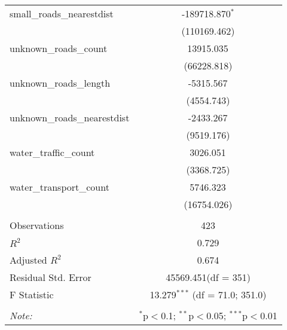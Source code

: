 \begin{table}[!htbp]
\begin{tabular}{@{\extracolsep{5pt}}lc}
 small_roads_nearestdist & -189718.870$^{*}$ \\
  & (110169.462) \\
 unknown_roads_count & 13915.035$^{}$ \\
  & (66228.818) \\
 unknown_roads_length & -5315.567$^{}$ \\
  & (4554.743) \\
 unknown_roads_nearestdist & -2433.267$^{}$ \\
  & (9519.176) \\
 water_traffic_count & 3026.051$^{}$ \\
  & (3368.725) \\
 water_transport_count & 5746.323$^{}$ \\
  & (16754.026) \\
\hline \\[-1.8ex]
 Observations & 423 \\
 $R^2$ & 0.729 \\
 Adjusted $R^2$ & 0.674 \\
 Residual Std. Error & 45569.451(df = 351)  \\
 F Statistic & 13.279$^{***}$ (df = 71.0; 351.0) \\
\hline
\hline \\[-1.8ex]
\textit{Note:} & \multicolumn{1}{r}{$^{*}$p$<$0.1; $^{**}$p$<$0.05; $^{***}$p$<$0.01} \\
\end{tabular}
\end{table}